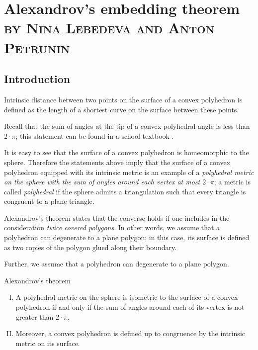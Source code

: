 \chapter[Alexandrov's embedding theorem]{Alexandrov's embedding theorem\\ \textsc{\normalsize by Nina Lebedeva and Anton Petrunin}}\label{chap:embedding}

\section{Introduction}

Intrinsic distance between two points on the surface of a convex polyhedron is defined as the length of a shortest curve on the surface between these points.

Recall that the sum of angles at the tip of a convex polyhedral angle is less than $2\cdot\pi$;
this statement can be found in a school textbook \cite[§~48]{kiselev-stereo-en}.

It is easy to see that the surface of a convex polyhedron is homeomorphic to the sphere.
Therefore the statements above imply that the surface of a convex polyhedron equipped with its intrinsic metric is an example of a \textit{polyhedral metric on the sphere with the sum of angles around each vertex at most $2\cdot\pi$};
a metric is called \emph{polyhedral} if the sphere admits a triangulation such that every triangle is congruent to a plane triangle.

Alexandrov's theorem states that the converse holds if one includes in the consideration \textit{twice covered polygons}.
In other words, we assume that a polyhedron can degenerate to a plane polygon;
in this case, its surface is defined as two copies of the polygon glued along their boundary.

Further, we assume that a polyhedron can degenerate to a plane polygon.

\pagebreak

\begin{thm}{Alexandrov's theorem}
\begin{enumerate}[I.]
\item\label{thm:exist}
A polyhedral metric on the sphere is isometric to the surface of a convex polyhedron if and only if the sum of angles around each of its vertex is not greater than $2\cdot\pi$.

\item\label{thm:unique} 
Moreover, a convex polyhedron is defined up to congruence by the intrinsic metric on its surface.
\end{enumerate}

\end{thm}

